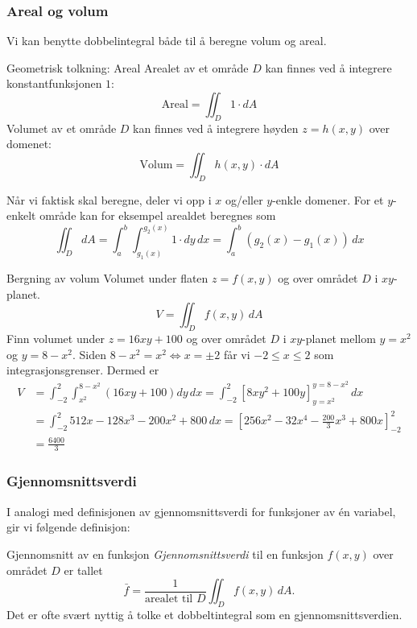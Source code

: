 \subsubsection*{Areal og volum}
Vi kan benytte dobbelintegral både til å beregne volum og areal. 
\begin{oppsum}{Geometrisk tolkning: Areal}
Arealet av et område \( D \) kan finnes ved å integrere konstantfunksjonen $1$:
\[
\text{Areal} = \iint_D 1\cdot dA
\]
Volumet av et område \( D \) kan finnes ved å integrere høyden $z=h(x,y)$ over domenet: 
\[
\text{Volum} = \iint_D h(x,y)\cdot dA
\]
\end{oppsum}

Når vi faktisk skal beregne, deler vi opp i $x$ og/eller $y$-enkle domener. For et $y$-enkelt område kan for eksempel arealdet beregnes som 
\[
\iint_D dA = \int_a^b \int_{g_1(x)}^{g_2(x)} 1\cdot dy\, dx = \int_a^b (g_2(x) - g_1(x))\, dx
\]


\begin{eks}{Bergning av volum}{}
Volumet under flaten \( z = f(x, y) \) og over området \( D \) i \( xy \)-planet.
\[
V = \iint_D f(x, y)\, dA
\]
Finn volumet under \( z = 16xy + 100 \) og over området $D$ i $xy$-planet mellom \( y= x^2 \) og \(y= 8 - x^2 \). Siden $8-x^2=x^2 \Leftrightarrow x=\pm 2$ får vi \( -2 \leq x \leq 2 \) som integrasjonsgrenser. Dermed er 
\begin{align*}
V &= \int_{-2}^{2} \int_{x^2}^{8 - x^2} (16xy + 100) dy\, dx = \int_{-2}^{2}\left[8xy^2+100y\right]_{y=x^2}^{y=8-x^2}\,dx \\ 
&= \int_{-2}^2 512x-128x^3-200x^2+800\, dx = \left[256x^2-32x^4-\frac{200}{3}x^3+800x\right]_{-2}^2 \\ &= \frac{6400}{3}
\end{align*}
\end{eks}

\subsubsection*{Gjennomsnittsverdi}
I analogi med definisjonen av gjennomsnittsverdi for funksjoner av én variabel, gir vi følgende definisjon:
\begin{defn}{Gjennomsnitt av en funksjon}
\emph{Gjennomsnittsverdi} til en funksjon \( f(x,y) \) over området \( D \) er tallet
\[
\bar{f} =
\frac{1}{\text{arealet til } D}
\iint_D f(x,y)\,dA.
\]
Det er ofte svært nyttig å tolke et dobbeltintegral som en gjennomsnittsverdien.
\end{defn}

